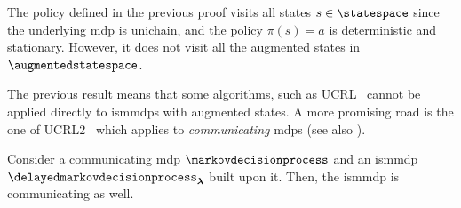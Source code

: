 \begin{remark}
    The policy defined in the previous proof visits all states $s\in\statespace$ since the underlying \gls{mdp} is unichain, and the policy $\pi(s) = a$ is deterministic and stationary. 
    However, it does not visit all the augmented states in $\augmentedstatespace$.
\end{remark}

The previous result means that some algorithms, such as UCRL~\cite{auer2006logarithmic} cannot be applied directly to \glspl{ismmdp} with augmented states.
A more promising road is the one of UCRL2~\cite{auer2008near} which applies to \emph{communicating} \glspl{mdp} \cite[Section~8.3.1]{puterman1994markov} (see also ).

\begin{prop}
\label{pp:communicating_ismmdp}
    Consider a communicating \gls{mdp} $\markovdecisionprocess$ and an \gls{ismmdp} $\delayedmarkovdecisionprocess_{\boldsymbol\lambda}$ built upon it. 
    Then, the \gls{ismmdp} is communicating as well.
\end{prop}

